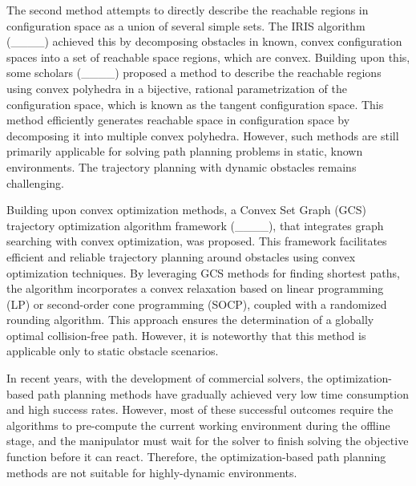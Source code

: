 The second method attempts to directly describe the reachable regions in configuration space as a union of several simple sets. The IRIS algorithm (____) achieved this by decomposing obstacles in known, convex configuration spaces into a set of reachable space regions, which are convex. Building upon this, some scholars (____) proposed a method to describe the reachable regions using convex polyhedra in a bijective, rational parametrization of the configuration space, which is known as the tangent configuration space. This method efficiently generates reachable space in configuration space by decomposing it into multiple convex polyhedra. However, such methods are still primarily applicable for solving path planning problems in static, known environments. The trajectory planning with dynamic obstacles remains challenging.

Building upon convex optimization methods, a Convex Set Graph (GCS) trajectory optimization algorithm framework (____), that integrates graph searching with convex optimization, was proposed. This framework facilitates efficient and reliable trajectory planning around obstacles using convex optimization techniques. By leveraging GCS methods for finding shortest paths, the algorithm incorporates a convex relaxation based on linear programming (LP) or second-order cone programming (SOCP), coupled with a randomized rounding algorithm. This approach ensures the determination of a globally optimal collision-free path. However, it is noteworthy that this method is applicable only to static obstacle scenarios.

In recent years, with the development of commercial solvers, the optimization-based path planning methods have gradually achieved very low time consumption and high success rates. However, most of these successful outcomes require the algorithms to pre-compute the current working environment during the offline stage, and the manipulator must wait for the solver to finish solving the objective function before it can react. Therefore, the optimization-based path planning methods are not suitable for highly-dynamic environments.

